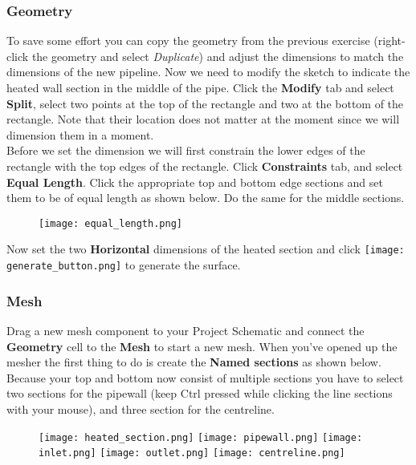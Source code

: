 \documentclass[11pt,a4paper,oneside]{scrartcl}
\newcommand\bfr[1]{\textcolor[rgb]{1,0.00,0.00}{\textbf{\textsf{#1}}}}
\begin{document}
\subsubsection*{Geometry}
To save some effort you can copy the geometry from the previous exercise (right-click the geometry and select \emph{Duplicate}) and adjust the dimensions to match the dimensions of the new pipeline. Now we need to modify the sketch to  indicate the heated wall section in the middle of the pipe. Click the \bfr{Modify} tab and select \bfr{Split}, select two points at the top of the rectangle and two at the bottom of the rectangle. Note that their location does not matter at the moment since we will dimension them in a moment.\\
Before we set the dimension we will first constrain the lower edges of the rectangle with the top edges of the rectangle. Click \bfr{Constraints} tab, and select \bfr{Equal Length}. Click the appropriate top and bottom edge sections and set them to be of equal length as shown below. Do the same for the middle sections.

\begin{figure}[H]
\begin{center}
    \texttt{[image: equal\_length.png]}
\end{center}
\end{figure}

Now set the two \bfr{Horizontal} dimensions of the heated section and click \texttt{[image: generate\_button.png]} to generate the surface.

\subsubsection*{Mesh}
Drag a new mesh component to your Project Schematic and connect the \bfr{Geometry} cell to the \bfr{Mesh} to start a new mesh. When you've opened up the mesher the first thing to do is create the \bfr{Named sections} as shown below. Because your top and bottom now consist of multiple sections you have to select two sections for the pipewall (keep Ctrl pressed while clicking the line sections with your mouse), and three section for the centreline.

\begin{figure}[H]
\begin{center}
    \texttt{[image: heated\_section.png]}
    \texttt{[image: pipewall.png]}
    \texttt{[image: inlet.png]}
    \texttt{[image: outlet.png]}
    \texttt{[image: centreline.png]}
\end{center}
\end{figure}
\end{document}

